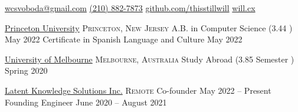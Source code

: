 \documentclass[10pt,letterpaper]{article}
\begin{document}
\sloppy


\nobreakvspace{0.3em}

\noindent\href{mailto:wcsvoboda.at.gmail.dot.com}{wcsvoboda\mbox{}@\mbox{}gmail.com}\sbull
\href{tel:2108827873}{(210) 882-7873}\sbull
\href{https://github.com/thisstillwill}{github.com/thisstillwill}\sbull
\href{https://will.cx}{will.cx}

\spacedhrule{0.9em}{-0.4em}


\headedsection
  {\href{https://www.princeton.edu/}{Princeton University}}
  {\textsc{Princeton, New Jersey}} {%
  \headedsubsection
    {A.B. in Computer Science \textnormal{(3.44 )}}
    {May 2022}
    {}
    \headedsubsection
    {Certificate in Spanish Language and Culture}
    {May 2022}{}
}

\headedsection
  {\href{https://www.unimelb.edu.au/}{University of Melbourne}}
  {\textsc{Melbourne, Australia}} {%
  \headedsubsection
    {Study Abroad \textnormal{(3.85 Semester )}}
    {Spring 2020}{}
}

\spacedhrule{0.5em}{-0.4em}


\headedsection
  {\href{https://www.linkedin.com/company/latent-knowledge}{Latent Knowledge Solutions Inc.}}
  {\textsc{Remote}} {%
  \headedsubsection
    {Co-founder}
    {May 2022 -- Present}
    {}
  \headedsubsection
    {Founding Engineer}
    {June 2020 -- August 2021}
    {}
}
\end{document}
